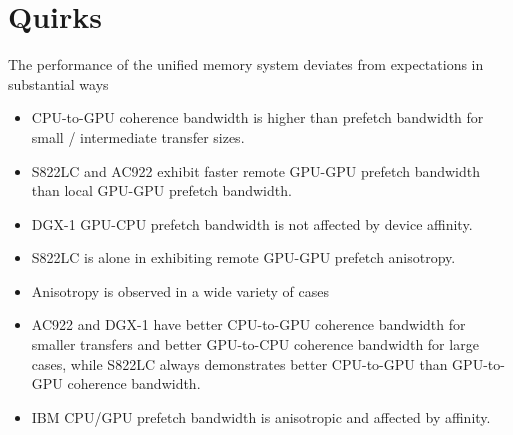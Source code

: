 \section{Quirks}

The performance of the unified memory system deviates from expectations in substantial ways

\begin{itemize}
\item CPU-to-GPU coherence bandwidth is higher than prefetch bandwidth for small / intermediate transfer sizes.
\item S822LC and AC922 exhibit faster remote GPU-GPU prefetch bandwidth than local GPU-GPU prefetch bandwidth.
\item DGX-1 GPU-CPU prefetch bandwidth is not affected by device affinity.
\item S822LC is alone in exhibiting remote GPU-GPU prefetch anisotropy.
\item Anisotropy is observed in a wide variety of cases
\item AC922 and DGX-1 have better CPU-to-GPU coherence bandwidth for smaller transfers and better GPU-to-CPU coherence bandwidth for large cases, while S822LC always demonstrates better CPU-to-GPU than GPU-to-GPU coherence bandwidth.
\item IBM CPU/GPU prefetch bandwidth is anisotropic and affected by affinity.
\end{itemize}
